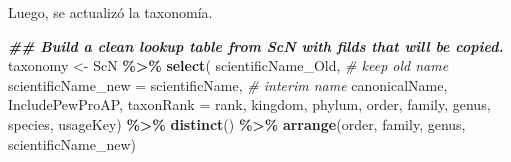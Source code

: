\documentclass[sn-apa,pdflatex]{sn-jnl}
\newenvironment{Shaded}{\begin{snugshade}}{\end{snugshade}}
\newcommand{\AttributeTok}[1]{\textcolor[rgb]{0.13,0.29,0.53}{#1}}
\newcommand{\CommentTok}[1]{\textcolor[rgb]{0.56,0.35,0.01}{\textit{#1}}}
\newcommand{\DocumentationTok}[1]{\textcolor[rgb]{0.56,0.35,0.01}{\textbf{\textit{#1}}}}
\newcommand{\FunctionTok}[1]{\textcolor[rgb]{0.13,0.29,0.53}{\textbf{#1}}}
\newcommand{\NormalTok}[1]{#1}
\newcommand{\OtherTok}[1]{\textcolor[rgb]{0.56,0.35,0.01}{#1}}
\newcommand{\SpecialCharTok}[1]{\textcolor[rgb]{0.81,0.36,0.00}{\textbf{#1}}}
\begin{document}
Luego, se actualizó la taxonomía.

\begin{Shaded}
\begin{Highlighting}[]
\DocumentationTok{\#\# Build a clean lookup table from ScN with filds that will be copied. }
\NormalTok{taxonomy }\OtherTok{\textless{}{-}}\NormalTok{ ScN }\SpecialCharTok{\%\textgreater{}\%} 
  \FunctionTok{select}\NormalTok{(}
\NormalTok{    scientificName\_Old, }\CommentTok{\# keep old name}
    \AttributeTok{scientificName\_new =}\NormalTok{ scientificName, }\CommentTok{\# interim name}
\NormalTok{    canonicalName,}
\NormalTok{    IncludePewProAP,}
    \AttributeTok{taxonRank =}\NormalTok{ rank,}
\NormalTok{    kingdom,}
\NormalTok{    phylum,}
\NormalTok{    order,}
\NormalTok{    family,}
\NormalTok{    genus,}
\NormalTok{    species,}
\NormalTok{    usageKey) }\SpecialCharTok{\%\textgreater{}\%} 
  \FunctionTok{distinct}\NormalTok{() }\SpecialCharTok{\%\textgreater{}\%} 
  \FunctionTok{arrange}\NormalTok{(order, family, genus, scientificName\_new)}
\end{Highlighting}
\end{Shaded}
\end{document}
